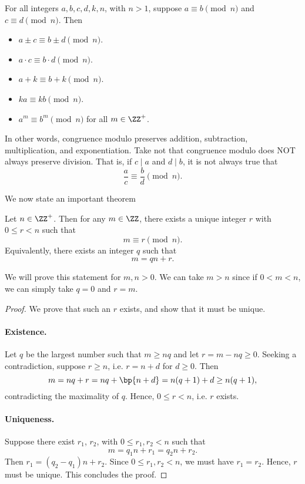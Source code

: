 \begin{proposition}
    For all integers $a, b, c, d, k, n$, with $n > 1$, suppose $a \equiv b \pmod{n}$ and $c \equiv d \pmod{n}$. Then
    \begin{itemize}
        \item $a \pm c \equiv b \pm d \pmod{n}$.
        \item $a \cdot c \equiv b \cdot d \pmod{n}$.
        \item $a + k \equiv b + k \pmod{n}$.
        \item $ka \equiv kb \pmod{n}$.
        \item $a^m \equiv b^m \pmod{n}$ for all $m \in \ZZ^+$.
    \end{itemize}
\end{proposition}

In other words, congruence modulo preserves addition, subtraction, multiplication, and exponentiation. Take not that congruence modulo does NOT always preserve division. That is, if $c \mid a$ and $d \mid b$, it is not always true that \[\frac{a}{c} \equiv \frac{b}{d} \pmod{n}.\]

We now state an important theorem

\begin{theorem}
    Let $n \in \ZZ^+$. Then for any $m \in \ZZ$, there exists a unique integer $r$ with $0 \leq r < n$ such that \[m \equiv r \pmod{n}.\] Equivalently, there exists an integer $q$ such that \[m = qn + r.\]
\end{theorem}
We will prove this statement for $m, n > 0$. We can take $m > n$ since if $0 < m < n$, we can simply take $q = 0$ and $r = m$.
\begin{proof}
    We prove that such an $r$ exists, and show that it must be unique.

    \item\paragraph{Existence.} Let $q$ be the largest number such that $m \geq nq$ and let $r = m - nq \geq 0$. Seeking a contradiction, suppose $r \geq n$, i.e. $r = n + d$ for $d \geq 0$. Then \[m = nq + r = nq + \bp{n + d} = n(q+1) + d \geq n(q+1),\] contradicting the maximality of $q$. Hence, $0 \leq r < n$, i.e. $r$ exists.

    \item\paragraph{Uniqueness.} Suppose there exist $r_1$, $r_2$, with $0 \leq r_1, r_2 < n$ such that \[m = q_1 n + r_1 = q_2 n + r_2.\] Then $r_1 = (q_2 - q_1) n + r_2$. Since $0 \leq r_1, r_2 < n$, we must have $r_1 = r_2$. Hence, $r$ must be unique. This concludes the proof.
\end{proof}